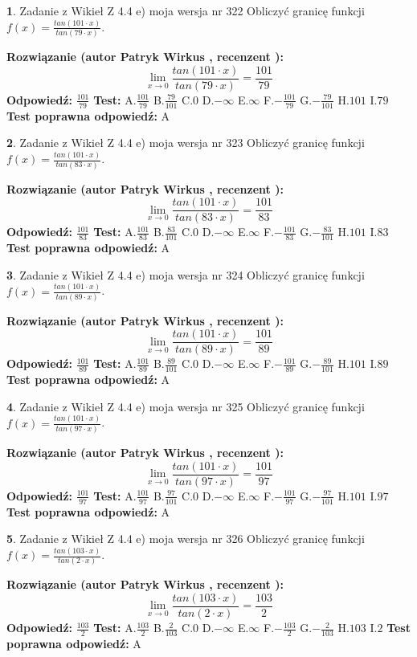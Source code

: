 \documentclass[12pt, a4paper]{article}
\theoremstyle{definition} %
\newtheorem{zad}{}
\newcommand{\zadStart}[1]{\begin{zad}#1\newline}
\newcommand{\zadStop}{\end{zad}}
\newcommand{\rozwStart}[2]{\noindent \textbf{Rozwiązanie (autor #1 , recenzent #2): }\newline}
\newcommand{\rozwStop}{\newline}
\newcommand{\odpStart}{\noindent \textbf{Odpowiedź:}\newline}
\newcommand{\odpStop}{\newline}
\newcommand{\testStart}{\noindent \textbf{Test:}\newline}
\newcommand{\testStop}{\newline}
\newcommand{\kluczStart}{\noindent \textbf{Test poprawna odpowiedź:}\newline}
\newcommand{\kluczStop}{\newline}
\begin{document}
\zadStart{Zadanie z Wikieł Z 4.4 e) moja wersja nr 322}
Obliczyć granicę funkcji $f(x)=\frac{tan(101\cdot x)}{tan(79\cdot x)}$.
\zadStop
\rozwStart{Patryk Wirkus}{}
$$\lim\limits_{x\to 0}\frac{tan(101\cdot x)}{tan(79\cdot x)}=
\frac{101}{79}$$
\rozwStop
\odpStart
$\frac{101}{79}$
\odpStop
\testStart
A.$\frac{101}{79}$
B.$\frac{79}{101}$
C.$0$
D.$-\infty$
E.$\infty$
F.$-\frac{101}{79}$
G.$-\frac{79}{101}$
H.$101$
I.$79$
\testStop
\kluczStart
A
\kluczStop



\zadStart{Zadanie z Wikieł Z 4.4 e) moja wersja nr 323}
Obliczyć granicę funkcji $f(x)=\frac{tan(101\cdot x)}{tan(83\cdot x)}$.
\zadStop
\rozwStart{Patryk Wirkus}{}
$$\lim\limits_{x\to 0}\frac{tan(101\cdot x)}{tan(83\cdot x)}=
\frac{101}{83}$$
\rozwStop
\odpStart
$\frac{101}{83}$
\odpStop
\testStart
A.$\frac{101}{83}$
B.$\frac{83}{101}$
C.$0$
D.$-\infty$
E.$\infty$
F.$-\frac{101}{83}$
G.$-\frac{83}{101}$
H.$101$
I.$83$
\testStop
\kluczStart
A
\kluczStop



\zadStart{Zadanie z Wikieł Z 4.4 e) moja wersja nr 324}
Obliczyć granicę funkcji $f(x)=\frac{tan(101\cdot x)}{tan(89\cdot x)}$.
\zadStop
\rozwStart{Patryk Wirkus}{}
$$\lim\limits_{x\to 0}\frac{tan(101\cdot x)}{tan(89\cdot x)}=
\frac{101}{89}$$
\rozwStop
\odpStart
$\frac{101}{89}$
\odpStop
\testStart
A.$\frac{101}{89}$
B.$\frac{89}{101}$
C.$0$
D.$-\infty$
E.$\infty$
F.$-\frac{101}{89}$
G.$-\frac{89}{101}$
H.$101$
I.$89$
\testStop
\kluczStart
A
\kluczStop



\zadStart{Zadanie z Wikieł Z 4.4 e) moja wersja nr 325}
Obliczyć granicę funkcji $f(x)=\frac{tan(101\cdot x)}{tan(97\cdot x)}$.
\zadStop
\rozwStart{Patryk Wirkus}{}
$$\lim\limits_{x\to 0}\frac{tan(101\cdot x)}{tan(97\cdot x)}=
\frac{101}{97}$$
\rozwStop
\odpStart
$\frac{101}{97}$
\odpStop
\testStart
A.$\frac{101}{97}$
B.$\frac{97}{101}$
C.$0$
D.$-\infty$
E.$\infty$
F.$-\frac{101}{97}$
G.$-\frac{97}{101}$
H.$101$
I.$97$
\testStop
\kluczStart
A
\kluczStop



\zadStart{Zadanie z Wikieł Z 4.4 e) moja wersja nr 326}
Obliczyć granicę funkcji $f(x)=\frac{tan(103\cdot x)}{tan(2\cdot x)}$.
\zadStop
\rozwStart{Patryk Wirkus}{}
$$\lim\limits_{x\to 0}\frac{tan(103\cdot x)}{tan(2\cdot x)}=
\frac{103}{2}$$
\rozwStop
\odpStart
$\frac{103}{2}$
\odpStop
\testStart
A.$\frac{103}{2}$
B.$\frac{2}{103}$
C.$0$
D.$-\infty$
E.$\infty$
F.$-\frac{103}{2}$
G.$-\frac{2}{103}$
H.$103$
I.$2$
\testStop
\kluczStart
A
\kluczStop
\end{document}
